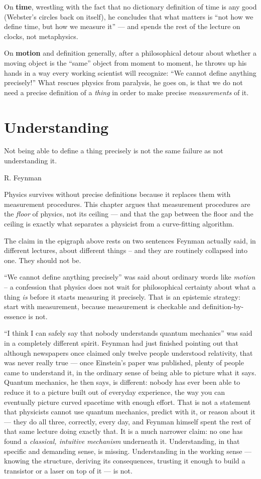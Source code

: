 On \textbf{time}, wrestling with the fact that no dictionary definition of time
is any good (Webster's circles back on itself), he concludes that what matters
is ``not how we define time, but how we measure it'' --- and spends the rest of
the lecture on clocks, not metaphysics.

On \textbf{motion} and definition generally, after a philosophical detour about
whether a moving object is the ``same'' object from moment to moment, he throws
up his hands in a way every working scientist will recognize: ``We cannot
define anything precisely!'' What rescues physics from paralysis, he goes on,
is that we do not need a precise definition of a \emph{thing} in order to make
precise \emph{measurements} of it.

\section{Understanding}
\label{rm:un}

\epigraph{Not being able to define a thing precisely is not the same failure 
as not understanding it.}{ R. Feynman}
 Physics survives without precise definitions because it replaces them with
 measurement procedures. This chapter argues that measurement procedures are
 the \emph{floor} of physics, not its ceiling --- and that the gap between the
 floor and the ceiling is exactly what separates a physicist from a
 curve-fitting algorithm.

The claim in the epigraph above rests on two sentences Feynman actually said,
in different lectures, about different things -- and they are routinely
collapsed into one. They should not be.

``We cannot define anything precisely'' was said about ordinary words like
\emph{motion} -- a confession that physics does not wait for philosophical
certainty about what a thing \emph{is} before it starts measuring it precisely.
That is an epistemic strategy: start with measurement, because measurement is
checkable and definition-by-essence is not.

``I think I can safely say that nobody understands quantum mechanics'' was said
in a completely different spirit.  Feynman had just finished pointing out that
although newspapers once claimed only twelve people understood relativity, that
was never really true --- once Einstein's paper was published, plenty of people
came to understand it, in the ordinary sense of being able to picture what it
says. Quantum mechanics, he then says, is different: nobody has ever been able
to reduce it to a picture built out of everyday experience, the way you can
eventually picture curved spacetime with enough effort. That is not a statement
that physicists cannot use quantum mechanics, predict with it, or reason about
it --- they do all three, correctly, every day, and Feynman himself spent the
rest of that same lecture doing exactly that. It is a much narrower claim: no
one has found a \emph{classical, intuitive mechanism} underneath it.
Understanding, in that specific and demanding sense, is missing. Understanding
in the working sense --- knowing the structure, deriving its consequences,
trusting it enough to build a transistor or a laser on top of it --- is not.

